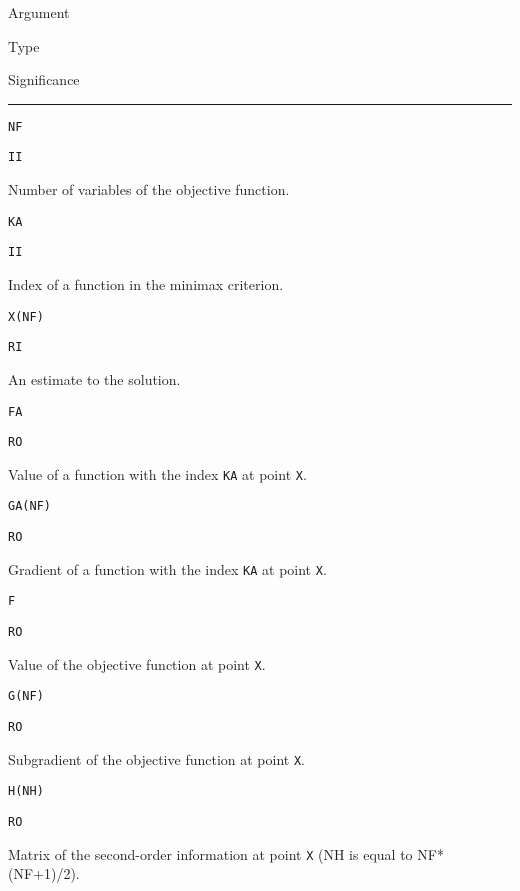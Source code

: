 \documentclass{article}
\begin{document}

{\small

\noindent\parbox{20mm}{Argument}\parbox{10mm}{$\!$Type}\parbox[t]{91mm}
  {Significance}\par\noindent\rule[1mm]{121mm}{.4pt}
  \par
\noindent\parbox{20mm}{\texttt{NF}}\parbox{10mm}{\texttt{II}}\parbox[t]{91mm}{
  Number of variables of the
  objective function.}
  \par\vspace{2mm}
\noindent\parbox{20mm}{\texttt{KA}}\parbox{10mm}{\texttt{II}}\parbox[t]{91mm}{
  Index of a function in the minimax criterion.}
  \par\vspace{2mm}
\noindent\parbox{20mm}{\texttt{X(NF)}}\parbox{10mm}{\texttt{RI}}\parbox[t]{91mm}{
  An estimate to the solution.}
  \par\vspace{2mm}
\noindent\parbox{20mm}{\texttt{FA}}\parbox{10mm}{\texttt{RO}}\parbox[t]{91mm}{
  Value of a function with the index \texttt{KA} at point \texttt{X}.}
  \par\vspace{2mm}
\noindent\parbox{20mm}{\texttt{GA(NF)}}\parbox{10mm}{\texttt{RO}}\parbox[t]{91mm}{
  Gradient of a function with the index \texttt{KA} at point \texttt{X}.}
  \par\vspace{2mm}
\noindent\parbox{20mm}{\texttt{F}}\parbox{10mm}{\texttt{RO}}\parbox[t]{91mm}{
  Value of the objective function at point \texttt{X}.}
  \par\vspace{2mm}
\noindent\parbox{20mm}{\texttt{G(NF)}}\parbox{10mm}{\texttt{RO}}\parbox[t]{91mm}{
  Subgradient of the objective function at point \texttt{X}.}
  \par\vspace{2mm}
\noindent\parbox{20mm}{\texttt{H(NH)}}\parbox{10mm}{\texttt{RO}}\parbox[t]{91mm}{
  Matrix of the second-order information at point \texttt{X}
  (NH is equal to NF*(NF+1)/2).}

\vspace{5mm}

}

\vspace{5mm}
\end{document}
